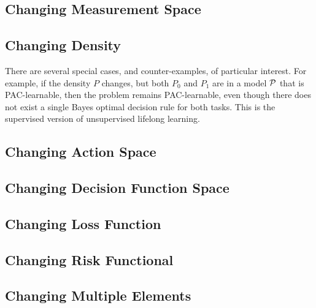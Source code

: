 \documentclass{article}
\begin{document}
\subsection{Changing Measurement Space}




\subsection{Changing Density}

There are several special cases, and counter-examples, of particular interest.  For example, if the density $P$ changes, but both $P_0$ and $P_1$ are in a model $\mathcal{P}$ that is PAC-learnable, then the problem remains PAC-learnable, even though there does not exist a single Bayes optimal decision rule for both tasks. This is the supervised version of unsupervised lifelong learning.  



\subsection{Changing Action Space}

\subsection{Changing Decision Function Space}

\subsection{Changing Loss Function}

\subsection{Changing Risk Functional}

\subsection{Changing Multiple Elements}

\end{document}

